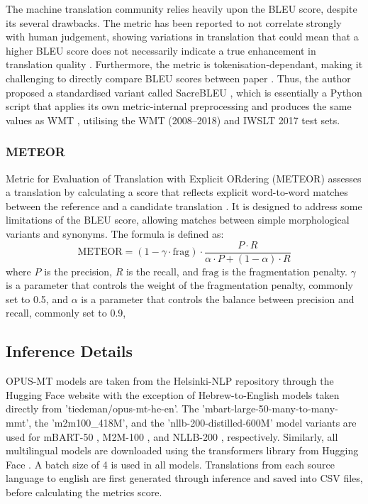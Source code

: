 \documentclass[a4paper, 11pt]{article}
\begin{document}
The machine translation community relies heavily upon the BLEU score, despite its several drawbacks. The metric has been reported to not correlate strongly with human judgement, showing variations in translation that could mean that a higher BLEU score does not necessarily indicate a true enhancement in translation quality \cite{callison-burch-2006-reevaluating-bleu}. Furthermore, the metric is tokenisation-dependant, making it challenging to directly compare BLEU scores between paper \cite{post-2018-sacrebleu}. Thus, the author proposed a standardised variant called SacreBLEU \cite{post-2018-sacrebleu}, which is essentially a Python script that applies its own metric-internal preprocessing and produces the same values as WMT \cite{barrault-2020-wmt}, utilising the WMT (2008–2018) and IWSLT 2017 \cite{cettolo-etal-2017-iwslt} test sets.

\subsubsection{METEOR}

Metric for Evaluation of Translation with Explicit ORdering (METEOR) \cite{lavie-2007-meteor} assesses a translation by calculating a score that reflects explicit word-to-word matches between the reference and a candidate translation \cite{agarwal-2008-meteor-mbleu-mter}. It is designed to address some limitations of the BLEU score, allowing matches between simple morphological variants and synonyms. The formula is defined as:
\begin{equation}
    \text{METEOR} = (1 - \gamma \cdot \text{frag}) \cdot \frac{P \cdot R}{\alpha \cdot P + (1 - \alpha) \cdot R}
\end{equation}
where \(P\) is the precision, \(R\) is the recall, and \(\text{frag}\) is the fragmentation penalty. \(\gamma\) is a parameter that controls the weight of the fragmentation penalty, commonly set to 0.5, and \(\alpha\) is a parameter that controls the balance between precision and recall, commonly set to 0.9,

\subsection{Inference Details}

OPUS-MT models are taken from the Helsinki-NLP repository through the Hugging Face website \cite{huggingface,zhang-2023-fine-tuning} with the exception of Hebrew-to-English models taken directly from 'tiedeman/opus-mt-he-en'. The 'mbart-large-50-many-to-many-mmt', the 'm2m100\_418M', and the 'nllb-200-distilled-600M' model variants are used for mBART-50 \cite{liu-2020-mbart}, M2M-100 \cite{fan-2020-m2m100}, and NLLB-200 \cite{nllb200-2020}, respectively. Similarly, all multilingual models are downloaded using the transformers \cite{wolf-2020-transformers} library from Hugging Face \cite{huggingface}. A batch size of 4 is used in all models. Translations from each source language to english are first generated through inference and saved into CSV files, before calculating the metrics score.
\end{document}
